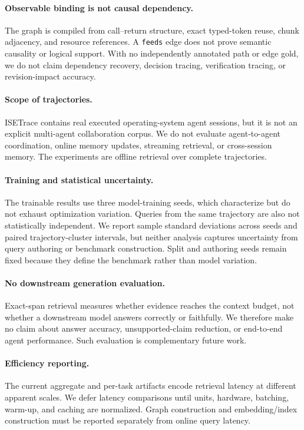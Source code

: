 \documentclass[sigconf,anonymous,review]{acmart}
\begin{document}
\paragraph{Observable binding is not causal dependency.}
The graph is compiled from call--return structure, exact typed-token reuse, chunk adjacency, and resource references. A \texttt{feeds} edge does not prove semantic causality or logical support. With no independently annotated path or edge gold, we do not claim dependency recovery, decision tracing, verification tracing, or revision-impact accuracy.

\paragraph{Scope of trajectories.}
ISETrace contains real executed operating-system agent sessions, but it is not an explicit multi-agent collaboration corpus. We do not evaluate agent-to-agent coordination, online memory updates, streaming retrieval, or cross-session memory. The experiments are offline retrieval over complete trajectories.

\paragraph{Training and statistical uncertainty.}
The trainable results use three model-training seeds, which characterize but do not exhaust optimization variation. Queries from the same trajectory are also not statistically independent. We report sample standard deviations across seeds and paired trajectory-cluster intervals, but neither analysis captures uncertainty from query authoring or benchmark construction. Split and authoring seeds remain fixed because they define the benchmark rather than model variation.

\paragraph{No downstream generation evaluation.}
Exact-span retrieval measures whether evidence reaches the context budget, not whether a downstream model answers correctly or faithfully. We therefore make no claim about answer accuracy, unsupported-claim reduction, or end-to-end agent performance. Such evaluation is complementary future work.

\paragraph{Efficiency reporting.}
The current aggregate and per-task artifacts encode retrieval latency at different apparent scales. We defer latency comparisons until units, hardware, batching, warm-up, and caching are normalized. Graph construction and embedding/index construction must be reported separately from online query latency.
\end{document}
